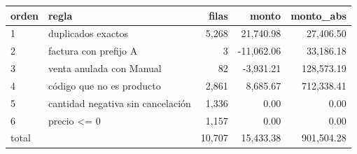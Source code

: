 \begin{tabular}{llrrr}
\toprule
orden & regla & filas & monto & monto\_abs \\
\midrule
1 & duplicados exactos & 5,268 & 21,740.98 & 27,406.50 \\
2 & factura con prefijo A & 3 & -11,062.06 & 33,186.18 \\
3 & venta anulada con Manual & 82 & -3,931.21 & 128,573.19 \\
4 & código que no es producto & 2,861 & 8,685.67 & 712,338.41 \\
5 & cantidad negativa sin cancelación & 1,336 & 0.00 & 0.00 \\
6 & precio <= 0 & 1,157 & 0.00 & 0.00 \\
total &  & 10,707 & 15,433.38 & 901,504.28 \\
\bottomrule
\end{tabular}
